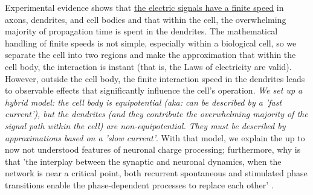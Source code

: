 Experimental evidence shows that \hyperlink{slow_current}{the electric signals
have a finite speed} in axons, dendrites, and cell bodies and that within the cell,
the overwhelming majority of propagation time is spent in the dendrites.
The mathematical handling of finite speeds is not simple, especially
within a biological cell, so we separate the cell into two regions
and make the approximation that within the cell body, the interaction is instant
(that is, the Laws of electricity are valid). However, outside the cell body,
the finite interaction speed in the dendrites leads to observable effects that significantly
influence the cell's operation.
\textit{We set up a hybrid model: the cell body is equipotential
(aka: can be described by a 'fast current'), but the dendrites
(and they contribute the overwhelming majority of the signal path within the cell)
are non-equipotential. They must be described by approximations
based on a 'slow current'}.
With that model, we explain the up to now not understood features of neuronal
charge processing; furthermore, why is that 'the interplay
between the synaptic and neuronal dynamics, when the network is near
a critical point, both recurrent spontaneous and stimulated phase
transitions enable the phase-dependent processes to replace each other'
\cite{BiologicalConservationLaw:2017}.

